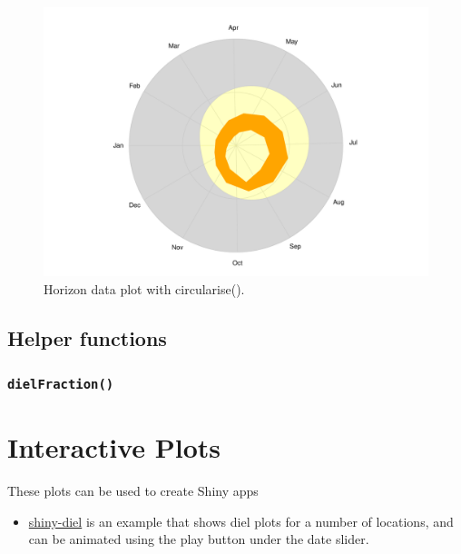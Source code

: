 \documentclass[
]{book}
\providecommand{\tightlist}{%
  \setlength{\itemsep}{0pt}\setlength{\parskip}{0pt}}
\begin{document}
\begin{figure}

{\centering \includegraphics[width=0.9\linewidth]{_main_files/figure-latex/lyme-temp-2-1} 

}

\caption{Horizon data plot with circularise().}\label{fig:lyme-temp-2}
\end{figure}

\hypertarget{helper-functions}{%
\subsection{Helper functions}\label{helper-functions}}

\hypertarget{dielfraction}{%
\subsubsection{\texorpdfstring{\texttt{dielFraction()}}{dielFraction()}}\label{dielfraction}}

\hypertarget{interactive-plots}{%
\section{Interactive Plots}\label{interactive-plots}}

These plots can be used to create Shiny apps

\begin{itemize}
\tightlist
\item
  \href{https://shiny.ebaker.me.uk/shiny-diel/}{shiny-diel} is an example that shows diel plots for a number of locations, and can be animated using the play button under the date slider.
\end{itemize}
\end{document}
